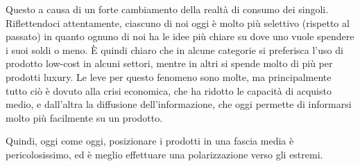 Questo a causa di un forte cambiamento della realtà di consumo dei singoli.
Riflettendoci attentamente, ciascuno di noi oggi è molto più selettivo
(rispetto al passato) in quanto ognuno di noi ha le idee più chiare su dove uno
vuole spendere i suoi soldi o meno. È quindi chiaro che in alcune categorie si
preferisca l'uso di prodotto low-cost in alcuni settori, mentre in altri si
spende molto di più per prodotti luxury. Le leve per questo fenomeno sono
molte, ma principalmente tutto ciò è dovuto alla crisi economica, che ha
ridotto le capacità di acquisto medio, e dall'altra la diffusione
dell'informazione, che oggi permette di informarsi molto più facilmente su un
prodotto.

Quindi, oggi come oggi, posizionare i prodotti in una fascia media è
pericolosissimo, ed è meglio effettuare una polarizzazione verso gli estremi.
